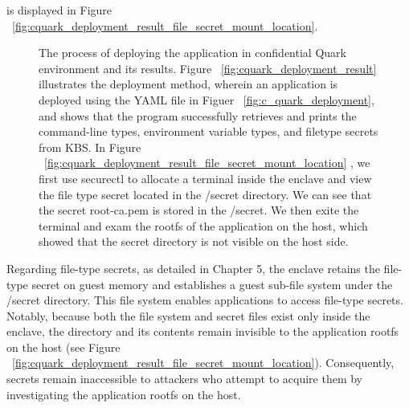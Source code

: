 is displayed in Figure ~\ref{fig:cquark_deployment_result_file_secret_mount_location}.
\begin{figure}[H]

    
    
    \caption[The process of deploying the application in confidential Quark environment and its results.]{The process of deploying the application in confidential Quark environment and its results. Figure ~\ref{fig:cquark_deployment_result} illustrates the deployment method, wherein an application is deployed using the YAML file in Figuer ~\ref{fig:c_quark_deployment},  
    and shows that the program successfully retrieves and prints the command-line types, environment variable types, and file\-type secrets from KBS. In Figure ~\ref{fig:cquark_deployment_result_file_secret_mount_location} , we first use securectl to allocate a terminal inside the enclave and view the file type secret located in the /secret directory. 
    We can see that the secret root-ca.pem is stored in the /secret. We then exite the terminal and exam the rootfs of the application on the host, which showed that the secret directory is not visible on the host side.}
\end{figure}


Regarding file-type secrets, as detailed in Chapter 5, the enclave retains the file-type secret on guest memory and establishes a guest sub-file system under the /secret directory. This file system enables applications to access file-type secrets. Notably, because both the file system and secret 
files exist only inside the enclave, the directory and its contents remain invisible to the application rootfs on the host (see Figure ~\ref{fig:cquark_deployment_result_file_secret_mount_location}). Consequently, secrets remain inaccessible to attackers who attempt to acquire them by investigating the application rootfs on the host.




